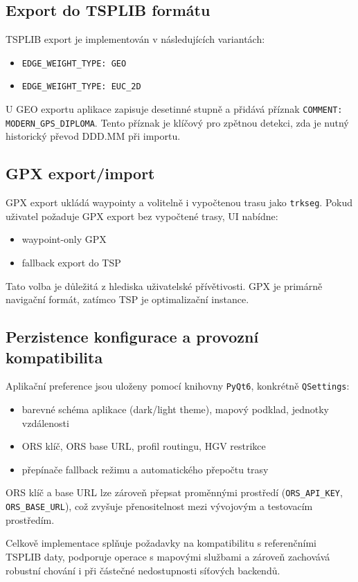 \subsection{Export do TSPLIB formátu}
TSPLIB export je implementován v následujících variantách:
\begin{itemize}
    \item \texttt{EDGE\_WEIGHT\_TYPE: GEO}
    \item \texttt{EDGE\_WEIGHT\_TYPE: EUC\_2D}
\end{itemize}

U GEO exportu aplikace zapisuje desetinné stupně a přidává příznak \texttt{COMMENT: MODERN\_GPS\_DIPLOMA}. Tento příznak je klíčový pro zpětnou detekci, zda je nutný historický převod DDD.MM při importu.



\subsection{GPX export/import}
GPX export ukládá waypointy a volitelně i vypočtenou trasu jako \texttt{trkseg}. Pokud uživatel požaduje GPX export bez vypočtené trasy, UI nabídne:
\begin{itemize}
    \item waypoint-only GPX
    \item fallback export do TSP
\end{itemize}

Tato volba je důležitá z hlediska uživatelské přívětivosti. GPX je primárně navigační formát, zatímco TSP je optimalizační instance.

\subsection{Perzistence konfigurace a provozní kompatibilita}
Aplikační preference jsou uloženy pomocí knihovny \texttt{PyQt6}, konkrétně \texttt{QSettings}:
\begin{itemize}
    \item barevné schéma aplikace (dark/light theme), mapový podklad, jednotky vzdálenosti
    \item ORS klíč, ORS base URL, profil routingu, HGV restrikce
    \item přepínače fallback režimu a automatického přepočtu trasy
\end{itemize}

ORS klíč a base URL lze zároveň přepsat proměnnými prostředí (\texttt{ORS\_API\_KEY}, \texttt{ORS\_BASE\_URL}), což zvyšuje přenositelnost mezi vývojovým a testovacím prostředím.

Celkově implementace splňuje požadavky na kompatibilitu s referenčními TSPLIB daty, podporuje operace s mapovými službami a zároveň zachovává robustní chování i při částečné nedostupnosti síťových backendů.
\endinput
